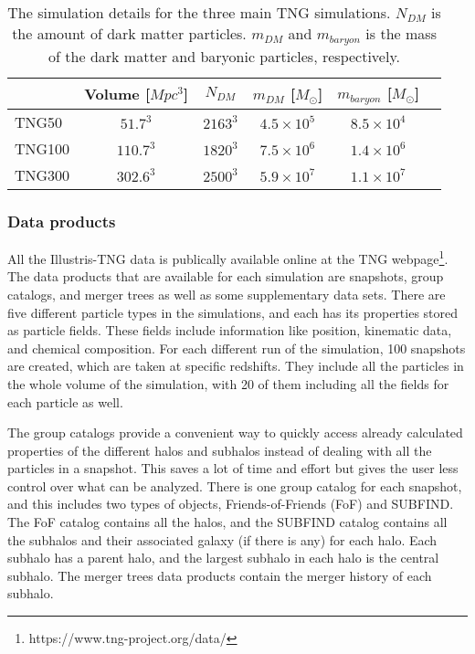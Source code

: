 \begin{table}
\begin{center}
\caption{The simulation details for the three main TNG simulations. $N_{DM}$ is the amount of dark matter particles. $m_{DM}$ and $m_{baryon}$ is the mass of the dark matter and baryonic particles, respectively.}
 \label{TNG}
\begin{tabular}{ l| c c c c c } 
 \hline
 \hline
   &  Volume [$Mpc^3$] & $N_{DM}$ & $m_{DM}$ [$M_{\odot}$] & $m_{baryon}$ [$M_{\odot}$] \\
 \hline
 TNG50 & $51.7^3$ & $2163^3$ & $4.5 \times 10^5 $ & $8.5 \times 10^4 $ \\ 
 TNG100 & $110.7^3$ & $1820^3$ & $7.5 \times 10^6 $ & $1.4 \times 10^6 $  \\ 
 TNG300 & $302.6^3$ & $2500^3$ & $5.9 \times 10^7 $ & $1.1 \times 10^7 $  \\ 
 \hline 
 \end{tabular}
\end{center}
\end{table}

\subsubsection{Data products}
All the Illustris-TNG data is publically available online at the TNG webpage\footnote{https://www.tng-project.org/data/}. The data products that are available for each simulation are snapshots, group catalogs, and merger trees as well as some supplementary data sets. There are five different particle types in the simulations, and each has its properties stored as particle fields. These fields include information like position, kinematic data, and chemical composition. For each different run of the simulation, 100 snapshots are created, which are taken at specific redshifts. They include all the particles in the whole volume of the simulation, with 20 of them including all the fields for each particle as well.

The group catalogs provide a convenient way to quickly access already calculated properties of the different halos and subhalos instead of dealing with all the particles in a snapshot. This saves a lot of time and effort but gives the user less control over what can be analyzed. There is one group catalog for each snapshot, and this includes two types of objects, Friends-of-Friends (FoF) and SUBFIND. The FoF catalog contains all the halos, and the SUBFIND catalog contains all the subhalos and their associated galaxy (if there is any) for each halo. Each subhalo has a parent halo, and the largest subhalo in each halo is the central subhalo. The merger trees data products contain the merger history of each subhalo.

